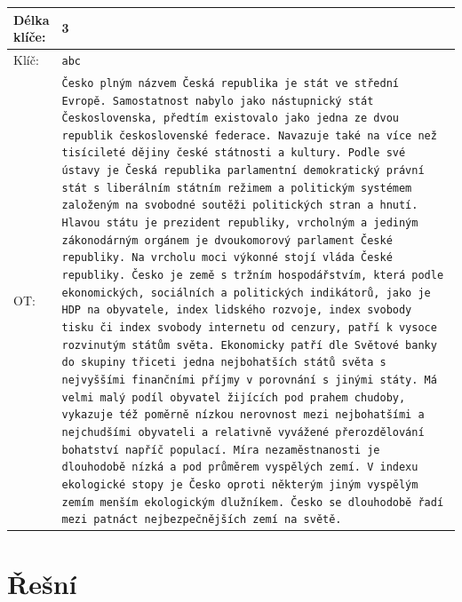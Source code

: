 \documentclass{article}
\begin{document}
\begin{longtable}{|p{0.1\linewidth}|p{0.9\linewidth}|}
    Délka klíče: & 3 \\ \hline
    Klíč: & \texttt{abc} \\ \hline
    OT: & \texttt{Česko plným názvem Česká republika je stát ve střední Evropě. Samostatnost nabylo jako nástupnický stát Československa, předtím existovalo jako jedna ze dvou republik československé federace. Navazuje také na více než tisícileté dějiny české státnosti a kultury. Podle své ústavy je Česká republika parlamentní demokratický právní stát s liberálním státním režimem a politickým systémem založeným na svobodné soutěži politických stran a hnutí. Hlavou státu je prezident republiky, vrcholným a jediným zákonodárným orgánem je dvoukomorový parlament České republiky. Na vrcholu moci výkonné stojí vláda České republiky. Česko je země s tržním hospodářstvím, která podle ekonomických, sociálních a politických indikátorů, jako je HDP na obyvatele, index lidského rozvoje, index svobody tisku či index svobody internetu od cenzury, patří k vysoce rozvinutým státům světa. Ekonomicky patří dle Světové banky do skupiny třiceti jedna nejbohatších států světa s nejvyššími finančními příjmy v porovnání s jinými státy. Má velmi malý podíl obyvatel žijících pod prahem chudoby, vykazuje též poměrně nízkou nerovnost mezi nejbohatšími a nejchudšími obyvateli a relativně vyvážené přerozdělování bohatství napříč populací. Míra nezaměstnanosti je dlouhodobě nízká a pod průměrem vyspělých zemí. V indexu ekologické stopy je Česko oproti některým jiným vyspělým zemím menším ekologickým dlužníkem. Česko se dlouhodobě řadí mezi patnáct nejbezpečnějších zemí na světě.} \\\hline
\end{longtable}
\raggedright
\newpage

\section{Řešní}
\end{document}
